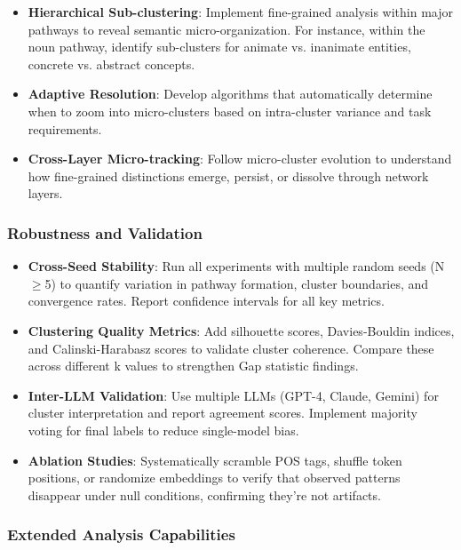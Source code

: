 \begin{itemize}
    \item \textbf{Hierarchical Sub-clustering}: Implement fine-grained analysis within major pathways to reveal semantic micro-organization. For instance, within the noun pathway, identify sub-clusters for animate vs. inanimate entities, concrete vs. abstract concepts.
    
    \item \textbf{Adaptive Resolution}: Develop algorithms that automatically determine when to zoom into micro-clusters based on intra-cluster variance and task requirements.
    
    \item \textbf{Cross-Layer Micro-tracking}: Follow micro-cluster evolution to understand how fine-grained distinctions emerge, persist, or dissolve through network layers.
\end{itemize}

\subsubsection{Robustness and Validation}

\begin{itemize}
    \item \textbf{Cross-Seed Stability}: Run all experiments with multiple random seeds (N$\geq$5) to quantify variation in pathway formation, cluster boundaries, and convergence rates. Report confidence intervals for all key metrics.
    
    \item \textbf{Clustering Quality Metrics}: Add silhouette scores, Davies-Bouldin indices, and Calinski-Harabasz scores to validate cluster coherence. Compare these across different k values to strengthen Gap statistic findings.
    
    \item \textbf{Inter-LLM Validation}: Use multiple LLMs (GPT-4, Claude, Gemini) for cluster interpretation and report agreement scores. Implement majority voting for final labels to reduce single-model bias.
    
    \item \textbf{Ablation Studies}: Systematically scramble POS tags, shuffle token positions, or randomize embeddings to verify that observed patterns disappear under null conditions, confirming they're not artifacts.
\end{itemize}

\subsubsection{Extended Analysis Capabilities}

